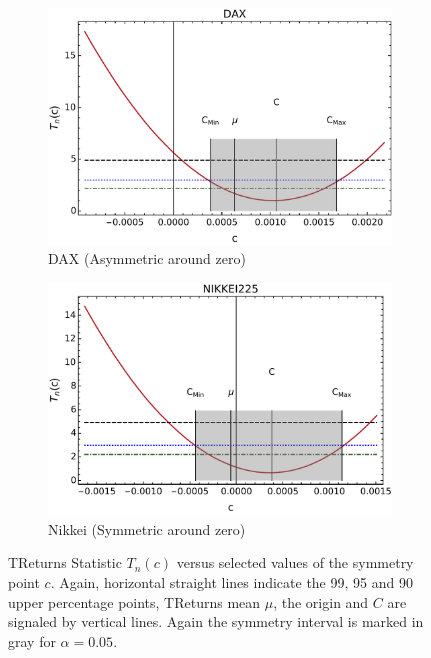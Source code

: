 \documentclass{elsarticle}
\begin{document}
\begin{figure}[h!tb]
        \begin{subfigure}[b]{0.45\textwidth}
            \centering 
            \includegraphics[width=\textwidth]{figures/SymmetryPlots/simetria_TReturns_DAX.pdf}
            \caption[]%
            {{\small DAX (Asymmetric around zero)}}
            \label{fig:TRetsFigsDAX}
        \end{subfigure}
        \quad
        \begin{subfigure}[b]{0.45\textwidth}
            \centering 
            \includegraphics[width=\textwidth]{figures/SymmetryPlots/simetria_TReturns_NIKKEI.pdf}
            \caption[]%
            {{\small Nikkei (Symmetric around zero)}}
            \label{fig:TRetsFigsNikkei}
        \end{subfigure}
        \caption[Plots of statistic $T_{n}(c)$ versus selected values of the symmetry point $c$ for our four different markets TReturns series data]
        {\small TReturns Statistic $T_{n}(c)$ versus selected values of the symmetry point $c$. Again, horizontal straight lines indicate the 99, 95 and 90 upper percentage points, TReturns mean $\mu$, the origin and $C$ are signaled by vertical lines. Again the symmetry interval is marked in gray for $\alpha=0.05$.} 
        \label{fig:TRetsFigs}
\end{figure}
\end{document}
